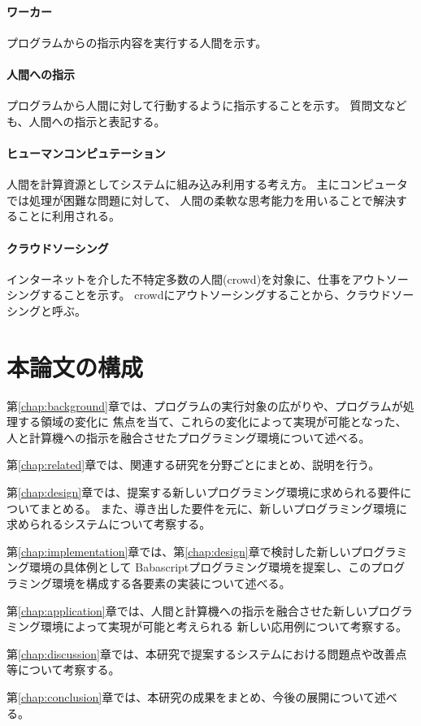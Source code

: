\paragraph{ワーカー}\label{ux30efux30fcux30abux30fc}

プログラムからの指示内容を実行する人間を示す。

\paragraph{人間への指示}\label{ux4ebaux9593ux3078ux306eux6307ux793a}

プログラムから人間に対して行動するように指示することを示す。
質問文なども、人間への指示と表記する。

\paragraph{ヒューマンコンピュテーション}\label{ux30d2ux30e5ux30fcux30deux30f3ux30b3ux30f3ux30d4ux30e5ux30c6ux30fcux30b7ux30e7ux30f3}

人間を計算資源としてシステムに組み込み利用する考え方。
主にコンピュータでは処理が困難な問題に対して、
人間の柔軟な思考能力を用いることで解決することに利用される。

\paragraph{クラウドソーシング}\label{ux30afux30e9ux30a6ux30c9ux30bdux30fcux30b7ux30f3ux30b0}

インターネットを介した不特定多数の人間(crowd)を対象に、仕事をアウトソーシングすることを示す。
crowdにアウトソーシングすることから、クラウドソーシングと呼ぶ。

\section{本論文の構成}\label{ux672cux8ad6ux6587ux306eux69cbux6210}

第\ref{chap:background}章では、プログラムの実行対象の広がりや、プログラムが処理する領域の変化に
焦点を当て、これらの変化によって実現が可能となった、人と計算機への指示を融合させたプログラミング環境について述べる。

第\ref{chap:related}章では、関連する研究を分野ごとにまとめ、説明を行う。

第\ref{chap:design}章では、提案する新しいプログラミング環境に求められる要件についてまとめる。
また、導き出した要件を元に、新しいプログラミング環境に求められるシステムについて考察する。

第\ref{chap:implementation}章では、第\ref{chap:design}章で検討した新しいプログラミング環境の具体例として
Babascriptプログラミング環境を提案し、このプログラミング環境を構成する各要素の実装について述べる。

第\ref{chap:application}章では、人間と計算機への指示を融合させた新しいプログラミング環境によって実現が可能と考えられる
新しい応用例について考察する。

第\ref{chap:discussion}章では、本研究で提案するシステムにおける問題点や改善点等について考察する。

第\ref{chap:conclusion}章では、本研究の成果をまとめ、今後の展開について述べる。
